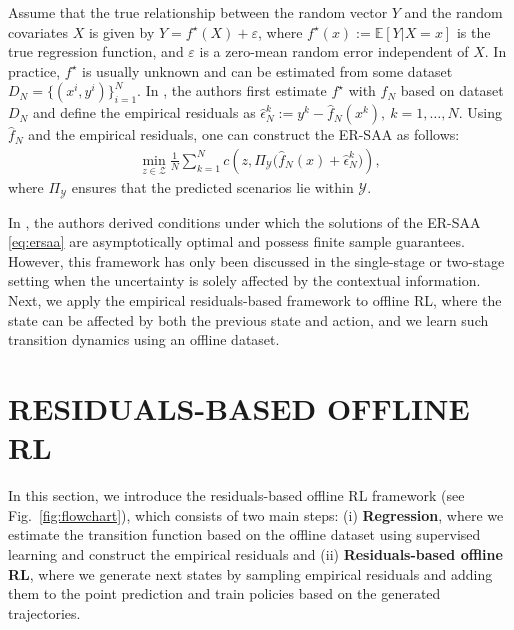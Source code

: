 \documentclass[letterpaper, 10 pt, conference]{ieeeconf}  %
\begin{document}
Assume that the true relationship between the random vector $Y$ and the random covariates $X$ is given by $Y = f^\star(X) + \varepsilon$, where $f^\star(x):=\mathbb E[Y|X=x]$ is the true regression function, and $\varepsilon$ is a zero-mean random error independent of $X$. 
In practice, $f^\star$ is usually unknown and can be estimated from some dataset $D_N=\{(x^{i},y^{i})\}_{i=1}^N$. In \cite{kannan2025data}, the authors first estimate $f^\star$ with $\hat f_N$ based on dataset $D_N$ and define the empirical residuals as $\hat{\epsilon}_N^k := y^k - \hat f_N(x^k), \ k=1,\dots,N.$ Using $\hat f_N$ and the empirical residuals, one can construct the ER-SAA as follows:
\begin{align}\label{eq:ersaa}
\min_{z\in\mathcal Z}\frac{1}{N}\sum_{k=1}^N c\!\left(z,\Pi_{\mathcal Y}\big(\hat f_N(x)+\hat\epsilon_N^k\big)\right),
\end{align}
where $\Pi_{\mathcal Y}$ ensures that the predicted scenarios lie within $\mathcal Y$.

In \cite{kannan2025data}, the authors derived conditions under which the solutions of the ER-SAA \eqref{eq:ersaa} are asymptotically optimal and possess finite sample guarantees. However, this framework has only been discussed in the single-stage or two-stage setting when the uncertainty is solely affected by the contextual information. Next, we apply the empirical residuals-based framework to offline RL, where the state can be affected by both the previous state and action, and we learn such transition dynamics using an offline dataset.

\section{RESIDUALS-BASED OFFLINE RL}\label{sec:offlineRL}
\allowdisplaybreaks
In this section, we introduce the residuals-based offline RL framework (see Fig.\ \ref{fig:flowchart}), which consists of two main steps: (i) \textbf{Regression}, where we estimate the transition function based on the offline dataset using supervised learning and construct the empirical residuals and (ii) \textbf{Residuals-based offline RL}, where we generate next states by sampling empirical residuals and adding them to the point prediction and train policies based on the generated trajectories. 
\end{document}

